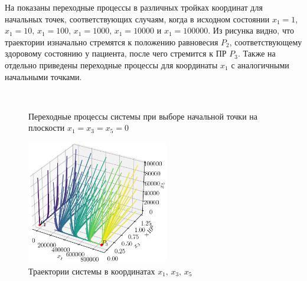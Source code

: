 \documentclass[14pt,a4paper]{extarticle}
\begin{document}
\begin{example}
		На  показаны переходные процессы в различных тройках координат для начальных точек, соответствующих случаям, когда в исходном состоянии $x_1=1$, $x_1=10$, $x_1=100$, $x_1=1000$, $x_1=10000$ и $x_1=100000$. Из рисунка видно, что траектории изначально стремятся к положению равновесия $P_2$, соответствующему здоровому состоянию у пациента, после чего стремится к ПР $P_3$. Также на  отдельно приведены переходные процессы для координаты $x_1$ с аналогичными начальными точками.
		
		\begin{figure}[h]
			\centering
			\\
			\caption{Переходные процессы системы при выборе начальной точки на плоскости $x_1=x_3=x_5=0$}
			\label{fig:on_D_border}
		\end{figure}
		\begin{figure}[h]
			\centering
			\includegraphics[width=0.55\textwidth]{media/Figure_12.png}
			\caption{Траектории системы в координатах $x_1,\, x_3,\, x_5$}
			\label{fig:model_K5}
		\end{figure}
		

\end{example}
\end{document}
